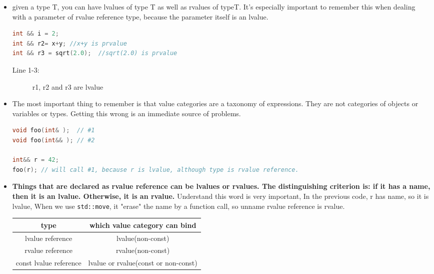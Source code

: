 \documentclass[a4paper,11pt,twoside]{book}
\newcommand{\tophline}{\hline }
\newcommand{\bottomhline}{\\ \hline }
\newcommand{\tophline}{ }
\newcommand{\bottomhline}{ }
\begin{document}
\begin{itemize}
	\item given a type T, you can have lvalues of type T as well as rvalues of typeT. It's especially important to remember this when dealing with a parameter of rvalue reference type, because the parameter itself is an lvalue.
\begin{lstlisting}[frame=single, language=c++, mathescape=true]
int && i = 2;  
int && r2= x+y; //x+y is prvalue
int && r3 = sqrt(2.0);  //sqrt(2.0) is prvalue 
\end{lstlisting}
\begin{description}
	\item[Line 1-3:] r1, r2 and r3 are lvalue
\end{description}

	\item The most important thing to remember is that value categories are a taxonomy of expressions. They are not categories of objects or variables or types. Getting this wrong is an immediate source of problems. 
\begin{lstlisting}[frame=single, language=c++, mathescape=true]
void foo(int& );  // #1
void foo(int&& ); // #2

int&& r = 42;
foo(r); // will call #1, because r is lvalue, although type is rvalue reference.
\end{lstlisting} 

\item \textbf{Things that are declared as rvalue reference can be lvalues or rvalues. The distinguishing criterion is: if it has a name, then it is an lvalue. Otherwise, it is an rvalue.} Understand this word is very important, In the previous code, r has name, so it is lvalue, When we use \texttt{std::move}, it "erase" the name by a function call, so unname rvalue reference is rvalue.
	
\begin{center}
		\begin{tabular}{|c|c|}
			\tophline 
			type & which value category can bind \\ 
			\tophline 
			lvalue reference & lvalue(non-const)  \\ 
			\tophline 
			rvalue reference &  rvalue(non-const)\\ 
			\tophline 
			const lvalue reference & lvalue or rvalue(const or non-const)  \bottomhline 
		\end{tabular} 
	\end{center}

\end{itemize}
\end{document}
